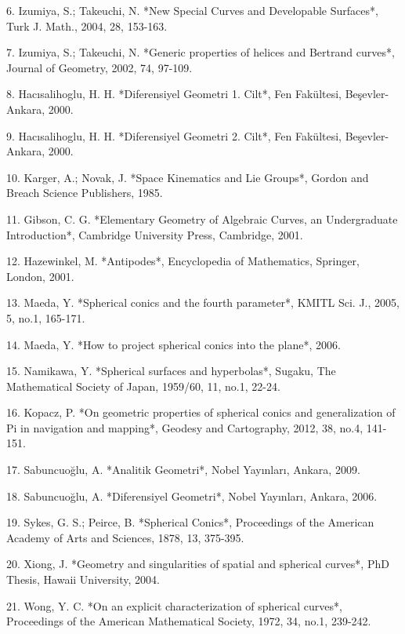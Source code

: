 \documentclass[a4paper,12pt]{article}
\begin{document}
6. Izumiya, S.; Takeuchi, N. *New Special Curves and Developable Surfaces*, Turk J. Math., 2004, 28, 153-163.

7. Izumiya, S.; Takeuchi, N. *Generic properties of helices and Bertrand curves*, Journal of Geometry, 2002, 74, 97-109.

8. Hacısalihoglu, H. H. *Diferensiyel Geometri 1. Cilt*, Fen Fakültesi, Beşevler-Ankara, 2000.

9. Hacısalihoglu, H. H. *Diferensiyel Geometri 2. Cilt*, Fen Fakültesi, Beşevler-Ankara, 2000.

10. Karger, A.; Novak, J. *Space Kinematics and Lie Groups*, Gordon and Breach Science Publishers, 1985.

11. Gibson, C. G. *Elementary Geometry of Algebraic Curves, an Undergraduate Introduction*, Cambridge University Press, Cambridge, 2001.

12. Hazewinkel, M. *Antipodes*, Encyclopedia of Mathematics, Springer, London, 2001.

13. Maeda, Y. *Spherical conics and the fourth parameter*, KMITL Sci. J., 2005, 5, no.1, 165-171.

14. Maeda, Y. *How to project spherical conics into the plane*, 2006.

15. Namikawa, Y. *Spherical surfaces and hyperbolas*, Sugaku, The Mathematical Society of Japan, 1959/60, 11, no.1, 22-24.

16. Kopacz, P. *On geometric properties of spherical conics and generalization of Pi in navigation and mapping*, Geodesy and Cartography, 2012, 38, no.4, 141-151.

17. Sabuncuoğlu, A. *Analitik Geometri*, Nobel Yayınları, Ankara, 2009.

18. Sabuncuoğlu, A. *Diferensiyel Geometri*, Nobel Yayınları, Ankara, 2006.

19. Sykes, G. S.; Peirce, B. *Spherical Conics*, Proceedings of the American Academy of Arts and Sciences, 1878, 13, 375-395.

20. Xiong, J. *Geometry and singularities of spatial and spherical curves*, PhD Thesis, Hawaii University, 2004.

21. Wong, Y. C. *On an explicit characterization of spherical curves*, Proceedings of the American Mathematical Society, 1972, 34, no.1, 239-242.
\end{document}

